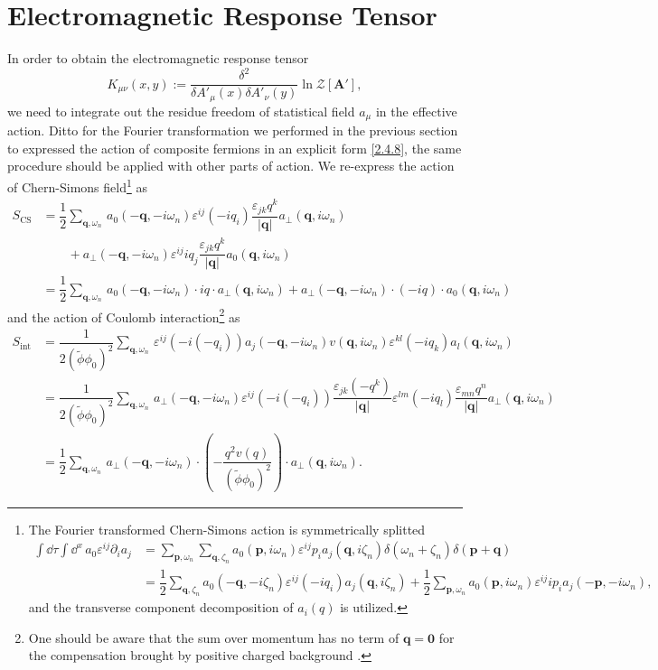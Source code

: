 \documentclass[bachelor,english,numbers]{ustcthesis}
\begin{document}
	\section{Electromagnetic Response Tensor}
		\indent\par In order to obtain the electromagnetic response tensor 
		\begin{equation*}
			K_{\mu\nu}(x,y):=\frac{\delta^2}{\delta A'_\mu(x)\delta A'_\nu(y)}\ln\mathcal{Z}[\bm{A'}],
		\end{equation*}
		we need to integrate out the residue freedom of statistical field $a_\mu$ in the effective action. Ditto for the Fourier transformation we performed in the previous section to expressed the action of composite fermions in an explicit form \eqref{2.4.8}, the same procedure should be applied with other parts of action. We re-express the action of Chern-Simons field\footnote{The Fourier transformed Chern-Simons action is symmetrically splitted
		\begin{align*}
			\int\dd\tau\int\dd^x\,a_0 \varepsilon^{ij}\partial_i a_j&=\sum_{\bm{p},\omega_n}\sum_{\bm{q},\zeta_n}a_0(\bm{p},i\omega_n)\varepsilon^{ij}p_i a_j(\bm{q},i\zeta_n)\delta(\omega_n+\zeta_n)\delta(\bm{p}+\bm{q})\\
			&=\dfrac{1}{2}\sum_{\bm{q},\zeta_n}a_0(-\bm{q},-i\zeta_n)\varepsilon^{ij}(-iq_i)a_j(\bm{q},i\zeta_n)+\dfrac{1}{2}\sum_{\bm{p},\omega_n}a_0(\bm{p},i\omega_n)\varepsilon^{ij}ip_ia_j(-\bm{p},-i\omega_n),
		\end{align*}
		and the transverse component decomposition of $a_i(q)$ is utilized.} as
		\begin{align}
			S_{\text{CS}}&=\dfrac{1}{2}\sum_{\bm{q},\omega_n}\,a_0(-\bm{q},-i\omega_n)\varepsilon^{ij}(-iq_i)\dfrac{\varepsilon_{jk}q^k}{|\bm{q}|}a_{\perp}(\bm{q},i\omega_n)\nonumber\\
			&\qquad+a_\perp(-\bm{q},-i\omega_n)\varepsilon^{ij}iq_j\dfrac{\varepsilon_{jk}q^k}{|\bm{q}|}a_0(\bm{q},i\omega_n)\nonumber\\
			&=\dfrac{1}{2}\sum_{\bm{q},\omega_n}\,a_0(-\bm{q},-i\omega_n)\cdot iq\cdot a_{\perp}(\bm{q},i\omega_n)+a_{\perp}(-\bm{q},-i\omega_n)\cdot(-iq)\cdot a_0(\bm{q},i\omega_n)\label{2.5.1}
		\end{align}
		and the action of Coulomb interaction\footnote{One should be aware that the sum over momentum has no term of $\bm{q}=\bm{0}$ for the compensation brought by positive charged background \cite{mahan2013many}.} as
		\begin{align}	
			S_{\text{int}}&=\dfrac{1}{2(\widetilde{\phi}\phi_0)^2 }\sum_{\bm{q},\omega_n}\,\varepsilon^{ij}(-i(-q_i)) a_j(-\bm{q},-i\omega_n)v(\bm{q},i\omega_n)\varepsilon^{kl} (-iq_k) a_l(\bm{q},i\omega_n)\nonumber\\
			&=\dfrac{1}{2(\widetilde{\phi}\phi_0)^2 }\sum_{\bm{q},\omega_n}\,a_{\perp}(-\bm{q},-i\omega_n)\varepsilon^{ij}(-i(-q_i))\dfrac{\varepsilon_{jk}(-q^k)}{|\bm{q}|}\varepsilon^{lm}(-iq_l)\dfrac{\varepsilon_{mn}q^n}{|\bm{q}|}a_{\perp}(\bm{q},i\omega_n)\nonumber\\
			&=\dfrac{1}{2}\sum_{\bm{q},\omega_n}\,a_{\perp}(-\bm{q},-i\omega_n)\cdot\left(-\dfrac{q^2v(q)}{(\widetilde{\phi}\phi_0)^2}\right)\cdot a_{\perp}(\bm{q},i\omega_n).\label{2.5.2}
		\end{align}
\end{document}
